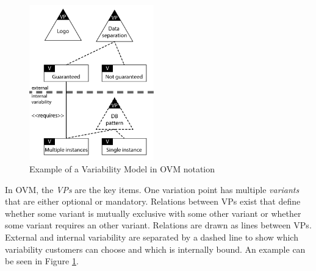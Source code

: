 \begin{itemize}
\begin{figure}[htr]
    \centering
    \includegraphics[width=0.48\textwidth]{assets/OVM}
    \caption{Example of a Variability Model in \acs{OVM} notation~\cite{mietzner2009variability}}
    \label{fig:ovm}
\end{figure}

In \ac{OVM}, the \textit{\acp{VP}} are the key items. One variation point has multiple \textit{variants} that are either optional or mandatory. Relations between \acp{VP} exist that define whether some variant is mutually exclusive with some other variant or whether some variant requires an other variant. Relations are drawn as lines between \acp{VP}. External and internal variability are separated by a dashed line to show which variability customers can choose and which is internally bound. An example can be seen in Figure \ref{fig:ovm}.
\end{itemize}


